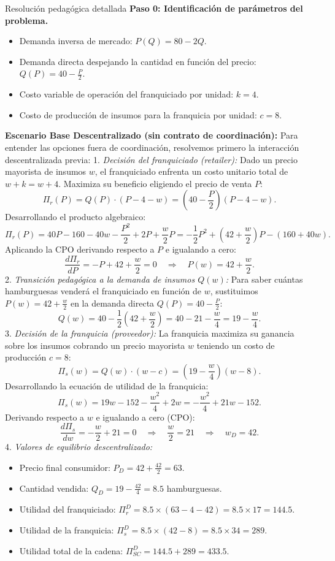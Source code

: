 \documentclass[11pt,a4paper]{article}
\begin{document}
\begin{pauta}{Resolución pedagógica detallada}
\textbf{Paso 0: Identificación de parámetros del problema.}
\begin{itemize}[itemsep=2pt]
    \item Demanda inversa de mercado: \(P(Q) = 80 - 2Q\).
    \item Demanda directa despejando la cantidad en función del precio: \(Q(P) = 40 - \frac{P}{2}\).
    \item Costo variable de operación del franquiciado por unidad: \(k = 4\).
    \item Costo de producción de insumos para la franquicia por unidad: \(c = 8\).
\end{itemize}

\textbf{Escenario Base Descentralizado (sin contrato de coordinación):}
Para entender las opciones fuera de coordinación, resolvemos primero la interacción descentralizada previa:
1. \textit{Decisión del franquiciado (retailer):} Dado un precio mayorista de insumos \(w\), el franquiciado enfrenta un costo unitario total de \(w + k = w + 4\). Maximiza su beneficio eligiendo el precio de venta \(P\):
\[
\Pi_r(P) = Q(P) \cdot (P - 4 - w) = \left(40 - \frac{P}{2}\right)(P - 4 - w).
\]
Desarrollando el producto algebraico:
\[
\Pi_r(P) = 40P - 160 - 40w - \frac{P^2}{2} + 2P + \frac{w}{2}P = -\frac{1}{2}P^2 + \left(42 + \frac{w}{2}\right)P - (160 + 40w).
\]
Aplicando la CPO derivando respecto a \(P\) e igualando a cero:
\[
\frac{d\Pi_r}{dP} = -P + 42 + \frac{w}{2} = 0 
\quad\Rightarrow\quad \boxed{P(w) = 42 + \frac{w}{2}.}
\]
2. \textit{Transición pedagógica a la demanda de insumos \(Q(w)\):}
Para saber cuántas hamburguesas venderá el franquiciado en función de \(w\), sustituimos \(P(w) = 42 + \frac{w}{2}\) en la demanda directa \(Q(P) = 40 - \frac{P}{2}\):
\[
Q(w) = 40 - \frac{1}{2}\left(42 + \frac{w}{2}\right) = 40 - 21 - \frac{w}{4} = \boxed{19 - \frac{w}{4}.}
\]
3. \textit{Decisión de la franquicia (proveedor):} La franquicia maximiza su ganancia sobre los insumos cobrando un precio mayorista \(w\) teniendo un costo de producción \(c = 8\):
\[
\Pi_s(w) = Q(w) \cdot (w - c) = \left(19 - \frac{w}{4}\right)(w - 8).
\]
Desarrollando la ecuación de utilidad de la franquicia:
\[
\Pi_s(w) = 19w - 152 - \frac{w^2}{4} + 2w = -\frac{w^2}{4} + 21w - 152.
\]
Derivando respecto a \(w\) e igualando a cero (CPO):
\[
\frac{d\Pi_s}{dw} = -\frac{w}{2} + 21 = 0 
\quad\Rightarrow\quad \frac{w}{2} = 21 
\quad\Rightarrow\quad \boxed{w_D = 42.}
\]
4. \textit{Valores de equilibrio descentralizado:}
\begin{itemize}[itemsep=2pt]
    \item Precio final consumidor: \(P_D = 42 + \frac{42}{2} = 63\).
    \item Cantidad vendida: \(Q_D = 19 - \frac{42}{4} = 8.5\) hamburguesas.
    \item Utilidad del franquiciado: \(\Pi_r^D = 8.5 \times (63 - 4 - 42) = 8.5 \times 17 = 144.5\).
    \item Utilidad de la franquicia: \(\Pi_s^D = 8.5 \times (42 - 8) = 8.5 \times 34 = 289\).
    \item Utilidad total de la cadena: \(\Pi_{SC}^D = 144.5 + 289 = 433.5\).
\end{itemize}


\end{pauta}
\end{document}
